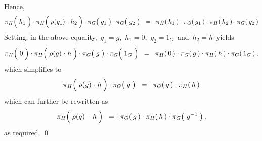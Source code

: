 \begin{enumerate}
	Hence,
	\begin{equation*}
		\pi_{H}\!\left(\;\overset{{\color{white}.}}{h_{1}}\;\right)
		\cdot
		\pi_{H}\!\left(\;\rho(g_{1}) \overset{{\color{white}1}}{\cdot} h_{2}\;\right)
		\cdot
		\pi_{G}\!\left(\;\overset{{\color{white}.}}{g_{1}}\;\right)
		\cdot
		\pi_{G}\!\left(\;\overset{{\color{white}.}}{g_{2}}\;\right)
	\;\; = \;\;
		\pi_{H}(\,h_{1}\,) \cdot \pi_{G}(\,g_{1}\,)
		\cdot
		\pi_{H}(\,h_{2}\,) \cdot \pi_{G}(\,g_{2}\,)
	\end{equation*}
	Setting, in the above equality,
	\,$g_{1} = g$,\,  $h_{1} = 0$,\, $g_{2} = 1_{G}$\, and \,$h_{2} = h$\,
	yields
	\begin{equation*}
		\pi_{H}\!\left(\;\overset{{\color{white}.}}{0}\;\right)
		\cdot
		\pi_{H}\!\left(\;\rho(g) \overset{{\color{white}1}}{\cdot} h\;\right)
		\cdot
		\pi_{G}\!\left(\;\overset{{\color{white}.}}{g}\;\right)
		\cdot
		\pi_{G}\!\left(\;\overset{{\color{white}.}}{1_{G}}\;\right)
	\;\; = \;\;
		\pi_{H}(\,0\,) \cdot \pi_{G}(\,g\,)
		\cdot
		\pi_{H}(\,h\,) \cdot \pi_{G}(\,1_{G}\,)\,,
	\end{equation*}
	which simplifies to
	\begin{equation*}
		\pi_{H}\!\left(\;\rho(g) \overset{{\color{white}1}}{\cdot} h\;\right)
		\cdot
		\pi_{G}\!\left(\;\overset{{\color{white}.}}{g}\;\right)
	\;\; = \;\;
		\pi_{G}(\,g\,)
		\cdot
		\pi_{H}(\,h\,)
	\end{equation*}
	which can further be rewritten as
	\begin{equation*}
		\pi_{H}\!\left(\;\rho(g) \overset{{\color{white}-}}{\cdot} h\;\right)
	\;\; = \;\;
		\pi_{G}(\,g\,)
		\cdot
		\pi_{H}(\,h\,)
		\cdot
		\pi_{G}\!\left(\,\overset{{\color{white}.}}{{\color{white}g}}\!\!g^{-1}\;\right),
	\end{equation*}
	as required. \qed
\end{enumerate}

